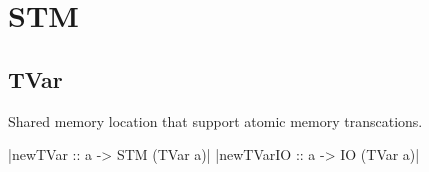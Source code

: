 \chapter{STM}

\section{TVar}

Shared memory location that support atomic memory transcations.

|newTVar :: a -> STM (TVar a)|
|newTVarIO :: a -> IO (TVar a)|
